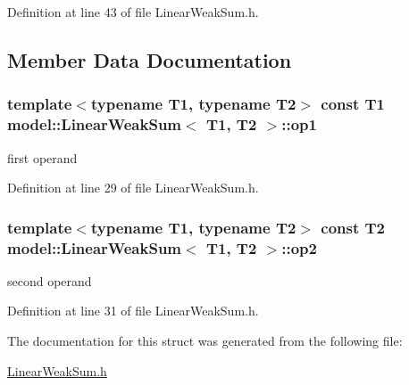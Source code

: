 Definition at line 43 of file Linear\+Weak\+Sum.\+h.



\subsection{Member Data Documentation}
\hypertarget{structmodel_1_1_linear_weak_sum_af18ed368b82c08cba7c6ad17dff216a4}{}
\subsubsection[{op1}]{\setlength{\rightskip}{0pt plus 5cm}template$<$typename T1, typename T2$>$ const T1 {\bf model\+::\+Linear\+Weak\+Sum}$<$ T1, T2 $>$\+::op1}\label{structmodel_1_1_linear_weak_sum_af18ed368b82c08cba7c6ad17dff216a4}


first operand 



Definition at line 29 of file Linear\+Weak\+Sum.\+h.

\hypertarget{structmodel_1_1_linear_weak_sum_ae427044192d89ac36fc969848bab876c}{}
\subsubsection[{op2}]{\setlength{\rightskip}{0pt plus 5cm}template$<$typename T1, typename T2$>$ const T2 {\bf model\+::\+Linear\+Weak\+Sum}$<$ T1, T2 $>$\+::op2}\label{structmodel_1_1_linear_weak_sum_ae427044192d89ac36fc969848bab876c}


second operand 



Definition at line 31 of file Linear\+Weak\+Sum.\+h.



The documentation for this struct was generated from the following file\+:\begin{DoxyCompactItemize}
\item 
\hyperlink{_linear_weak_sum_8h}{Linear\+Weak\+Sum.\+h}\end{DoxyCompactItemize}
